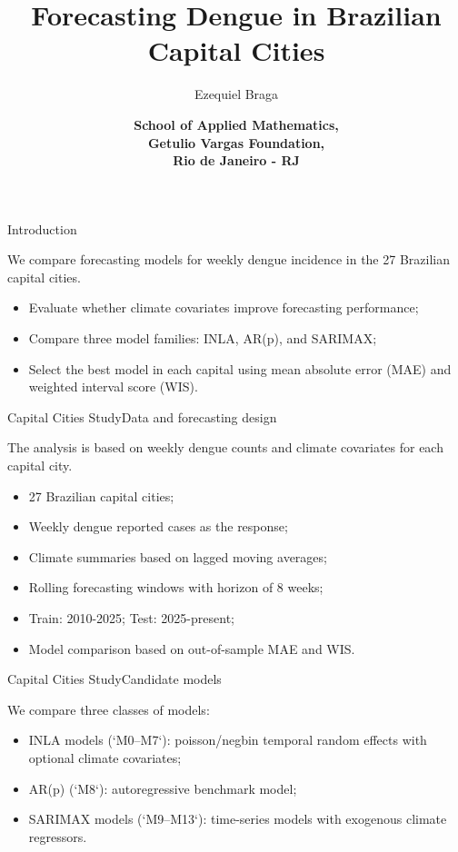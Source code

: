 \documentclass[xcolor=dvipsnames,t,aspectratio=169]{beamer} %
\title{Forecasting Dengue in Brazilian Capital Cities}
\author{
    Ezequiel Braga
}
\date{{\color{fgv_dark_blue} \textbf{School of Applied Mathematics, \\ Getulio Vargas Foundation, \\ Rio de Janeiro - RJ}}}
\newcommand{\highlight}[1]{{\color{fgv_light_blue} #1}}
\begin{document}
\frame[plain]{\titlepage}
\setcounter{framenumber}{0}

\begin{frame}[c]{Introduction}

    \begin{display}[Goal]
        We compare forecasting models for weekly dengue incidence in the 27 Brazilian capital cities.
        \begin{itemize}
            \item Evaluate whether climate covariates improve forecasting performance;
            \item Compare three model families: INLA, AR(p), and SARIMAX;
            \item Select the best model in each capital using mean absolute error (MAE) and weighted interval score (WIS).
        \end{itemize}
    \end{display}

\end{frame}

\begin{frame}[c]{Capital Cities Study}{Data and forecasting design}

    \begin{display}[Set-up]
        The analysis is based on weekly dengue counts and climate covariates for each capital city.
        \begin{itemize}
            \item 27 Brazilian capital cities;
            \item Weekly dengue reported cases as the response;
            \item Climate summaries based on lagged moving averages;
            \item Rolling forecasting windows with horizon of 8 weeks;
            \item Train: 2010-2025; Test: 2025-present;
            \item Model comparison based on out-of-sample MAE and WIS.
        \end{itemize}
    \end{display}

\end{frame}

\begin{frame}[c]{Capital Cities Study}{Candidate models}

    \begin{display}
        We compare three classes of models:
        \begin{itemize}
            \item \highlight{INLA models} (`M0--M7`): poisson/negbin temporal random effects with optional climate covariates;
            \item \highlight{AR(p)} (`M8`): autoregressive benchmark model;
            \item \highlight{SARIMAX models} (`M9--M13`): time-series models with exogenous climate regressors.
        \end{itemize}
    \end{display}

\end{frame}
\end{document}

